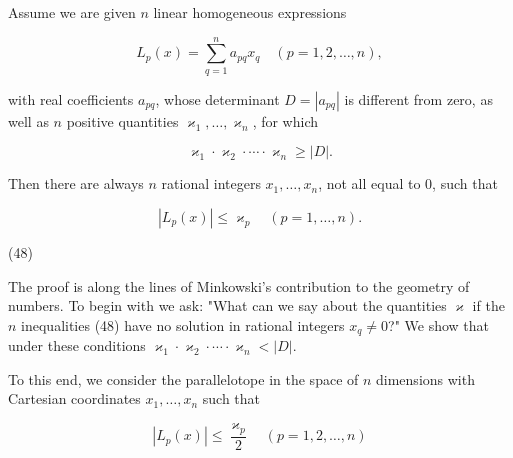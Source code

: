 Assume we are given $n$ linear homogeneous expressions

$$L_p(x) = \sum_{q=1}^{n} a_{pq} x_q \quad (p = 1, 2, \ldots, n),$$

with real coefficients $a_{pq}$, whose determinant $D = |a_{pq}|$ is different from zero, as well as $n$ positive quantities $\varkappa_1, \ldots, \varkappa_n$, for which

$$\varkappa_1 \cdot \varkappa_2 \cdot \cdots \cdot \varkappa_n \geq |D|.$$

Then there are always $n$ rational integers $x_1, \ldots, x_n$, not all equal to 0, such that

$$|L_p(x)| \leq \varkappa_p \quad (p = 1, \ldots, n).$$

(48)

The proof is along the lines of Minkowski's contribution to the geometry of numbers. To begin with we ask: "What can we say about the quantities $\varkappa$ if the $n$ inequalities (48) have no solution in rational integers $x_q \neq 0$?" We show that under these conditions $\varkappa_1 \cdot \varkappa_2 \cdot \cdots \cdot \varkappa_n < |D|$.

To this end, we consider the parallelotope in the space of $n$ dimensions with Cartesian coordinates $x_1, \ldots, x_n$ such that

$$|L_p(x)| \leq \frac{\varkappa_p}{2} \quad (p = 1, 2, \ldots, n)$$

